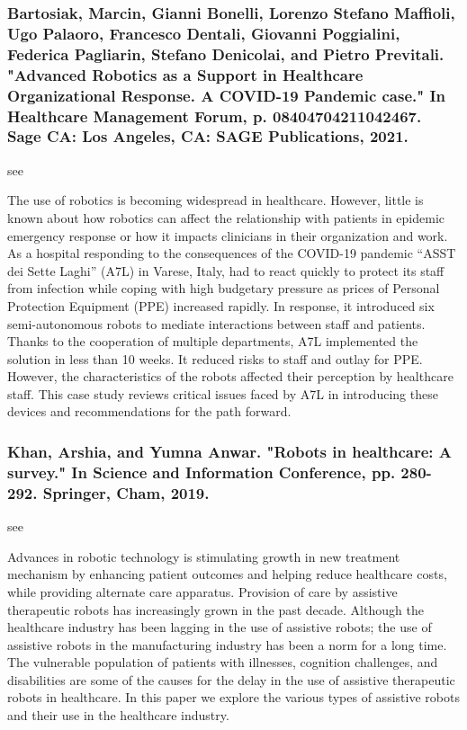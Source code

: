 \documentclass[conference]{IEEEtran}
\begin{document}
\medskip
\subsubsection{Bartosiak, Marcin, Gianni Bonelli, Lorenzo Stefano Maffioli, Ugo Palaoro, Francesco Dentali, Giovanni Poggialini, Federica Pagliarin, Stefano Denicolai, and Pietro Previtali. "Advanced Robotics as a Support in Healthcare Organizational Response. A COVID-19 Pandemic case." In Healthcare Management Forum, p. 08404704211042467. Sage CA: Los Angeles, CA: SAGE Publications, 2021.}
see \cite{bartosiak2021advanced}

The use of robotics is becoming widespread in healthcare. However, little is known about how robotics can affect the relationship with patients in epidemic emergency response or how it impacts clinicians in their organization and work. As a hospital responding to the consequences of the COVID-19 pandemic “ASST dei Sette Laghi” (A7L) in Varese, Italy, had to react quickly to protect its staff from infection while coping with high budgetary pressure as prices of Personal Protection Equipment (PPE) increased rapidly. In response, it introduced six semi-autonomous robots to mediate interactions between staff and patients. Thanks to the cooperation of multiple departments, A7L implemented the solution in less than 10 weeks. It reduced risks to staff and outlay for PPE. However, the characteristics of the robots affected their perception by healthcare staff. This case study reviews critical issues faced by A7L in introducing these devices and recommendations for the path forward.

\medskip
\subsubsection{Khan, Arshia, and Yumna Anwar. "Robots in healthcare: A survey." In Science and Information Conference, pp. 280-292. Springer, Cham, 2019.}
see \cite{khan2019robots}

Advances in robotic technology is stimulating growth in new treatment mechanism by enhancing patient outcomes and helping reduce healthcare costs, while providing alternate care apparatus. Provision of care by assistive therapeutic robots has increasingly grown in the past decade. Although the healthcare industry has been lagging in the use of assistive robots; the use of assistive robots in the manufacturing industry has been a norm for a long time. The vulnerable population of patients with illnesses, cognition challenges, and disabilities are some of the causes for the delay in the use of assistive therapeutic robots in healthcare. In this paper we explore the various types of assistive robots and their use in the healthcare industry.
\end{document}
